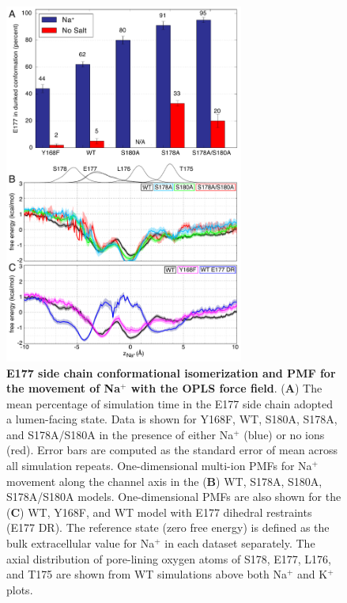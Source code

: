 \begin{refsection}
\begin{figure}[!ptb]
\centering
\includegraphics[width=0.7\textwidth]{nav6/Nav6FigS1}
\caption[E177 side chain conformational isomerization and PMF for the movement of Na$^+$ with the OPLS force field]{\textbf{E177 side chain conformational isomerization and PMF for the movement of Na$^+$ with the OPLS force field}. (\textbf{A}) The mean percentage of simulation time in the E177 side chain adopted a lumen-facing state. Data is shown for Y168F, WT, S180A, S178A, and S178A/S180A in the presence of either Na$^+$ (blue) or no ions (red). Error bars are computed as the standard error of mean across all simulation repeats. One-dimensional multi-ion PMFs for Na$^+$ movement along the channel axis in the (\textbf{B}) WT, S178A, S180A, S178A/S180A models. One-dimensional PMFs are also shown for the (\textbf{C}) WT, Y168F, and WT model with E177 dihedral restraints (E177 DR). The reference state (zero free energy) is defined as the bulk extracellular value for Na$^+$ in each dataset separately. The axial distribution of pore-lining oxygen atoms of S178, E177, L176, and T175 are shown from WT simulations above both Na$^+$ and K$^+$ plots.}
\label{fig:nav6figS1}
\end{figure}


\end{refsection}
